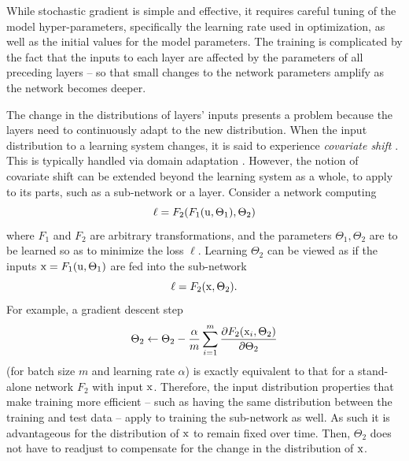 \documentclass[twocolumn]{article}
\begin{document}
While stochastic gradient is simple and effective, it requires careful tuning of
the model hyper-parameters, specifically the learning rate used in optimization,
as well as the initial values for the model parameters. The training is
complicated by the fact that the inputs to each layer are affected by the
parameters of all preceding layers -- so that
small changes to the network parameters amplify as the network becomes
deeper.

The change in the distributions of layers' inputs presents a problem
because the layers need to continuously adapt to the new
distribution. When the input distribution to a learning system
changes, it is said to experience {\em covariate shift}
\cite{covariate-shift}. This is typically handled via domain
adaptation \cite{domain-adaptation-survey}. However, the notion of
covariate shift can be extended beyond the learning system as a whole,
to apply to its parts, such as a sub-network or a layer. Consider a
network computing $$\ell = F_2(F_1(\mathrm{u}, \Theta_1), \Theta_2)$$ where
$F_1$ and $F_2$ are arbitrary transformations, and the parameters
$\Theta_1, \Theta_2$ are to be learned so as to minimize the loss
$\ell$.  Learning $\Theta_2$ can be viewed as if the inputs
$\mathrm{x}=F_1(\mathrm{u},\Theta_1)$ are fed into the sub-network
$$\ell = F_2(\mathrm{x}, \Theta_2).$$ For example, a gradient descent step
$$\Theta_2\leftarrow \Theta_2 - \frac{\alpha}{m}\sum_{i=1}^m
\frac{\partial F_2(\mathrm{x}_i,\Theta_2)}{\partial \Theta_2}$$ (for batch size $m$ and learning
rate $\alpha$) is exactly equivalent to that for a stand-alone network
$F_2$ with input $\mathrm{x}$.  Therefore, the input distribution properties
that make training more efficient -- such as having the same
distribution between the training and test data -- apply to training
the sub-network as well.  As such it is advantageous for the
distribution of $\mathrm{x}$ to remain fixed over time. Then, $\Theta_2$ does
not have to readjust to compensate for the change in the distribution
of $\mathrm{x}$.
\end{document}
